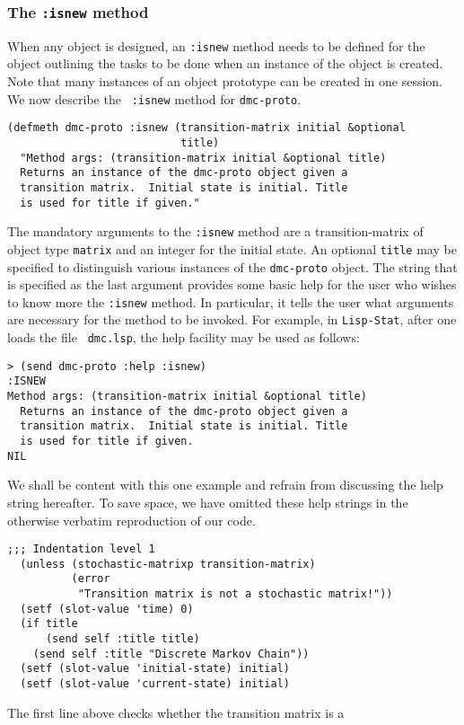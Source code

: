 \subsubsection{The {\tt :isnew} method}
\label{subsubsec:dmc-isnew}
When any object is designed, an {\tt :isnew} method needs to be
defined for the object outlining the tasks to be done when an instance
of the object is created. Note that many instances of an object
prototype can be created in one session. We now describe the {\tt
  :isnew} method for {\tt dmc-proto}.  
\begin{verbatim}
(defmeth dmc-proto :isnew (transition-matrix initial &optional 
                           title)
  "Method args: (transition-matrix initial &optional title)
  Returns an instance of the dmc-proto object given a 
  transition matrix.  Initial state is initial. Title 
  is used for title if given."
\end{verbatim}
The mandatory arguments to the {\tt :isnew} method are a
transition-matrix of object type {\tt matrix} and an integer for the
initial state. An optional {\tt title} may be specified to distinguish
various instances of the {\tt dmc-proto} object.  The string that is
specified as the last argument provides some basic help for the user who
wishes to know more the {\tt :isnew} method.  In particular, it tells
the user what arguments are necessary for the method to be invoked. 
For example, in {\tt Lisp-Stat}, after one loads the file {\tt
  dmc.lsp}, the help facility may be used as follows:
\begin{verbatim}
> (send dmc-proto :help :isnew)
:ISNEW
Method args: (transition-matrix initial &optional title)
  Returns an instance of the dmc-proto object given a 
  transition matrix.  Initial state is initial. Title
  is used for title if given.
NIL
\end{verbatim}
We shall be content with this one example and refrain from discussing
the help string hereafter. To save space, we have omitted these help
strings in the otherwise verbatim reproduction of our code.
\begin{verbatim}
;;; Indentation level 1
  (unless (stochastic-matrixp transition-matrix)
          (error 
           "Transition matrix is not a stochastic matrix!"))
  (setf (slot-value 'time) 0)
  (if title
      (send self :title title)
    (send self :title "Discrete Markov Chain"))
  (setf (slot-value 'initial-state) initial)
  (setf (slot-value 'current-state) initial)
\end{verbatim}
The first line  above checks whether the transition matrix is a
